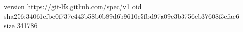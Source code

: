 version https://git-lfs.github.com/spec/v1
oid sha256:34061cfbe0f737e443b58b0b89d6b9610c5fbd97a09c3b3756eb37608f3cfae6
size 341786
